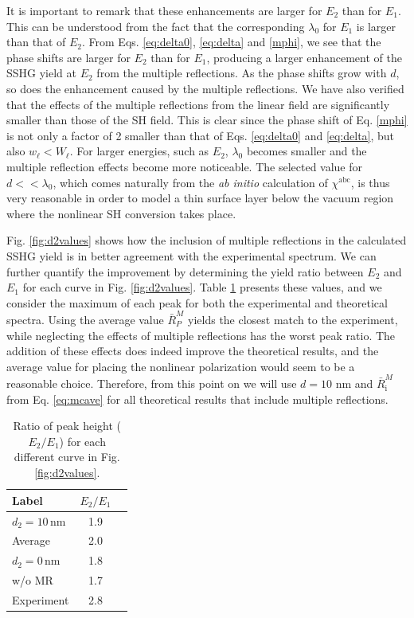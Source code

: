 \documentclass[aps,prb,10pt,showpacs,letterpaper,twocolumn]{revtex4-1}
\begin{document}
It is important to remark that these enhancements are larger for $E_{2}$ than
for $E_{1}$. This can be understood from the fact that the corresponding
$\lambda_{0}$ for $E_{1}$ is larger than that of $E_{2}$. From Eqs.
\eqref{eq:delta0}, \eqref{eq:delta} and \eqref{mphi}, we see that the phase
shifts are larger for $E_{2}$ than for $E_{1}$, producing a larger enhancement
of the SSHG yield at $E_{2}$ from the multiple reflections. As the phase shifts
grow with $d$, so does the enhancement caused by the multiple reflections. We
have also verified that the effects of the multiple reflections from the linear
field are significantly smaller than those of the SH field. This is clear since
the phase shift of Eq. \eqref{mphi} is not only a factor of 2 smaller than that
of Eqs. \eqref{eq:delta0} and \eqref{eq:delta}, but also $w_\ell < W_\ell$. For
larger energies, such as $E_{2}$, $\lambda_{0}$ becomes smaller and the multiple
reflection effects become more noticeable. The selected value for $d <<
\lambda_{0}$, which comes naturally from the \emph{ab initio} calculation of
$\chi^{\mathrm{abc}}$, is thus very reasonable in order to model a thin surface
layer below the vacuum region where the nonlinear SH conversion takes place.

{\color{red}
Fig. \ref{fig:d2values} shows how the inclusion of multiple reflections in the
calculated SSHG yield is in better agreement with the experimental spectrum. We
can further quantify the improvement by determining the yield ratio between
$E_{2}$ and $E_{1}$ for each curve in Fig. \ref{fig:d2values}. Table
\ref{tab:rppintensity} presents these values, and we consider the maximum of
each peak for both the experimental and theoretical spectra. Using the average
value $\bar{R}^{M}_P$ yields the closest match to the experiment, while
neglecting the effects of multiple reflections has the worst peak ratio.
The addition of these effects does indeed improve the theoretical results, and
the average value for placing the nonlinear polarization would seem to be a
reasonable choice. Therefore, from this point on we will use $d=10$ nm and
$\bar{R}^{M}_{\mathrm{i}}$ from Eq. \eqref{eq:mcave} for all theoretical results
that include multiple reflections.
}

\begin{table}[b]
{\color{red}
\caption{Ratio of peak height ($E_{2}/E_{1}$) for each different curve in
Fig. \ref{fig:d2values}.}
\label{tab:rppintensity}
\centering
\begin{tabular}{ | l | c | c | }
\hline
Label                   &   $E_{2}/E_{1}$  \\
\hline
$d_{2}=10\,\mathrm{nm}$ &   1.9            \\
Average                 &   2.0            \\
$d_{2}= 0\,\mathrm{nm}$ &   1.8            \\
w/o MR                  &   1.7            \\
Experiment              &   2.8            \\
\hline
\end{tabular}
}
\end{table}
\end{document}
